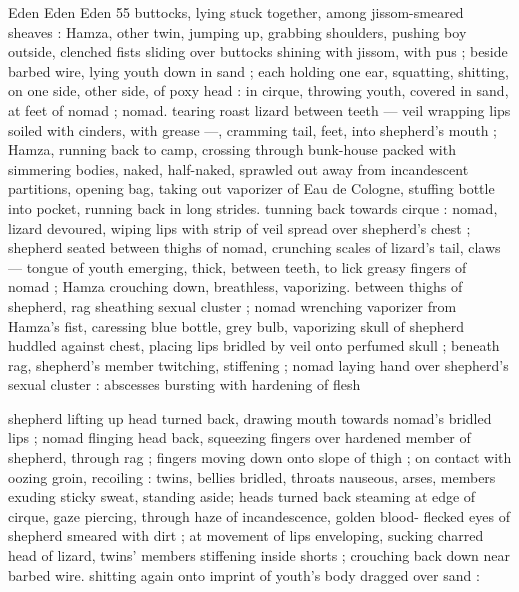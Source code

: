 Eden Eden Eden 55
buttocks, lying stuck together, among jissom-smeared sheaves :
Hamza, other twin, jumping up, grabbing shoulders, pushing boy
outside, clenched fists sliding over buttocks shining with jissom, with
pus ; beside barbed wire, lying youth down in sand ; each holding
one ear, squatting, shitting, on one side, other side, of poxy head :
in cirque, throwing youth, covered in sand, at feet of nomad ; nomad.
tearing roast lizard between teeth — veil wrapping lips soiled with
cinders, with grease —, cramming tail, feet, into shepherd's mouth
; Hamza, running back to camp, crossing through bunk-house packed
with simmering bodies, naked, half-naked, sprawled out away from
incandescent partitions, opening bag, taking out vaporizer of Eau de
Cologne, stuffing bottle into pocket, running back in long strides.
tunning back towards cirque : nomad, lizard devoured, wiping lips
with strip of veil spread over shepherd's chest ; shepherd seated
between thighs of nomad, crunching scales of lizard’s tail, claws —
tongue of youth emerging, thick, between teeth, to lick greasy
fingers of nomad ; Hamza crouching down, breathless, vaporizing.
between thighs of shepherd, rag sheathing sexual cluster ; nomad
wrenching vaporizer from Hamza's fist, caressing blue bottle, grey
bulb, vaporizing skull of shepherd huddled against chest, placing
lips bridled by veil onto perfumed skull ; beneath rag, shepherd's
member twitching, stiffening ; nomad laying hand over shepherd's
sexual cluster : abscesses bursting with hardening of flesh

shepherd lifting up head turned back, drawing mouth towards
nomad's bridled lips ; nomad flinging head back, squeezing fingers
over hardened member of shepherd, through rag ; fingers moving
down onto slope of thigh ; on contact with oozing groin, recoiling :
twins, bellies bridled, throats nauseous, arses, members exuding
sticky sweat, standing aside; heads turned back steaming at edge of
cirque, gaze piercing, through haze of incandescence, golden blood-
flecked eyes of shepherd smeared with dirt ; at movement of lips
enveloping, sucking charred head of lizard, twins’ members
stiffening inside shorts ; crouching back down near barbed wire.
shitting again onto imprint of youth's body dragged over sand :

